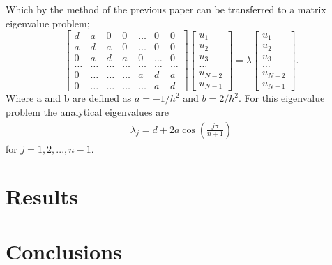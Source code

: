 \documentclass{emulateapj}
\begin{document}
Which by the method of the previous paper can be transferred to a matrix eigenvalue problem;
%
\begin{equation*}
    \begin{bmatrix} d& a & 0   & 0    & \dots  &0     & 0 \\
                                a & d & a & 0    & \dots  &0     &0 \\
                                0   & a & d & a  &0       &\dots & 0\\
                                \dots  & \dots & \dots & \dots  &\dots      &\dots & \dots\\
                                0   & \dots & \dots & \dots  &a  &d & a\\
                                0   & \dots & \dots & \dots  &\dots       &a & d\end{bmatrix} 
                                 \begin{bmatrix} u_1 \\ u_2 \\ u_3 \\ \dots \\ u_{N-2} \\ u_{N-1}\end{bmatrix} = \lambda \begin{bmatrix} u_1 \\ u_2 \\ u_3 \\ \dots \\ u_{N-2} \\ u_{N-1}\end{bmatrix} . 
\label{eq:matrixse} 
\end{equation*}
%
Where a and b are defined as $a = -1/h^2$ and $b = 2/h^2$. For this eigenvalue problem the analytical eigenvalues are
%
\begin{gather}\label{eq:eigenvals_analytical}
    \lambda_j = d + 2a\cos\left(\frac{j\pi}{n+1}\right)
\end{gather}
for $j = 1,2,...,n-1$. 








\section{Results}
\label{sec:results}



\section{Conclusions}
\label{sec:conclusions}
\end{document}
